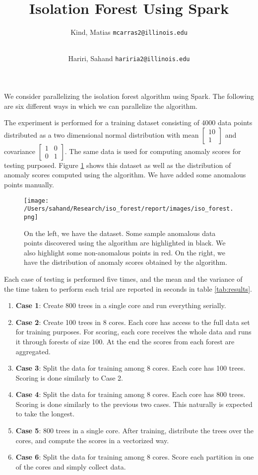 \documentclass{amsart}
\author{
	Kind, Matias
	\texttt{mcarras2@illinois.edu}
	\\ \and\\
	Hariri, Sahand
	\texttt{hariria2@illinois.edu}
}
\title{Isolation Forest Using Spark}
\begin{document}
	
\maketitle
We consider parallelizing the isolation forest algorithm using Spark. The following are six different ways in which we can parallelize the algorithm.

The experiment is performed for a training dataset consisting of 4000 data points distributed as a two dimensional normal distribution with mean $\left[\begin{matrix}10 \\  1 \end{matrix}\right]$ and covariance $\left[\begin{matrix}1 & 0 \\  0 & 1\end{matrix}\right]$. The same data is used for computing anomaly scores for testing purposed. Figure \ref{fig:iso_forest} shows this dataset as well as the distribution of anomaly scores computed using the algorithm. We have added some anomalous points manually. 

\begin{figure}[H]
	\texttt{[image: /Users/sahand/Research/iso\_forest/report/images/iso\_forest.png]}
	\caption{On the left, we have the dataset. Some sample anomalous data points discovered using the algorithm are highlighted in black. We also highlight some non-anomalous points in red. On the right, we have the distribution of anomaly scores obtained by the algorithm.}
	\label{fig:iso_forest}
\end{figure}

Each case of testing is performed five times, and the mean and the variance of the time taken to perform each trial are reported in seconds in table \ref{tab:results}. 
	
	\begin{enumerate}
		\item \textbf{Case 1}: Create 800 trees in a single core and run everything serially.
		\item \textbf{Case 2}: Create 100 trees in 8 cores. Each core has access to the full data set for training purposes. For scoring, each core receives the whole data and runs it through forests of size 100. At the end the scores from each forest are aggregated. 
		\item \textbf{Case 3}: Split the data for training among 8 cores. Each core has 100 trees. Scoring is done similarly to Case 2. 
		\item \textbf{Case 4}: Split the data for training among 8 cores. Each core has 800 trees. Scoring is done similarly to the previous two cases. This naturally is expected to take the longest. 
		\item \textbf{Case 5}: 800 trees in a single core. After training, distribute the trees over the cores, and compute the scores in a vectorized way.
		\item \textbf{Case 6}: Split the data for training among 8 cores. Score each partition in one of the cores and simply collect data. 
	\end{enumerate}
\end{document}
